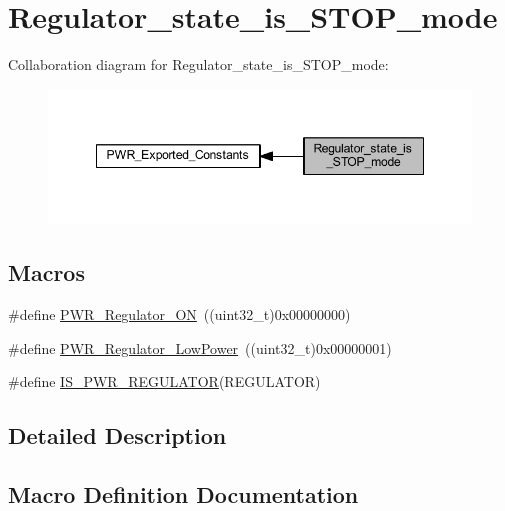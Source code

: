 \hypertarget{group___regulator__state__is___s_t_o_p__mode}{}\section{Regulator\+\_\+state\+\_\+is\+\_\+\+S\+T\+O\+P\+\_\+mode}
\label{group___regulator__state__is___s_t_o_p__mode}
Collaboration diagram for Regulator\+\_\+state\+\_\+is\+\_\+\+S\+T\+O\+P\+\_\+mode\+:
\nopagebreak
\begin{figure}[H]
\begin{center}
\leavevmode
\includegraphics[width=348pt]{group___regulator__state__is___s_t_o_p__mode}
\end{center}
\end{figure}
\subsection*{Macros}
\begin{DoxyCompactItemize}
\item 
\#define \hyperlink{group___regulator__state__is___s_t_o_p__mode_gabf58b999bff6b4bf0fb5b97d74a75683}{P\+W\+R\+\_\+\+Regulator\+\_\+\+ON}~((uint32\+\_\+t)0x00000000)
\item 
\#define \hyperlink{group___regulator__state__is___s_t_o_p__mode_ga13745136d094661358d373b67ebf1ac7}{P\+W\+R\+\_\+\+Regulator\+\_\+\+Low\+Power}~((uint32\+\_\+t)0x00000001)
\item 
\#define \hyperlink{group___regulator__state__is___s_t_o_p__mode_ga03c105070272141c0bab5f2b74469072}{I\+S\+\_\+\+P\+W\+R\+\_\+\+R\+E\+G\+U\+L\+A\+T\+OR}(R\+E\+G\+U\+L\+A\+T\+OR)
\end{DoxyCompactItemize}


\subsection{Detailed Description}


\subsection{Macro Definition Documentation}
\mbox{\label{group___regulator__state__is___s_t_o_p__mode_ga03c105070272141c0bab5f2b74469072}} 

